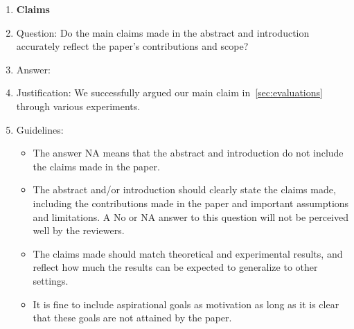 \documentclass{article}
\begin{document}
\begin{enumerate}

\item {\bf Claims}
    \item[] Question: Do the main claims made in the abstract and introduction accurately reflect the paper's contributions and scope?
    \item[] Answer: \answerYes{} %
    \item[] Justification: We successfully argued our main claim in~\ref{sec:evaluations} through various experiments.
    \item[] Guidelines:
    \begin{itemize}
        \item The answer NA means that the abstract and introduction do not include the claims made in the paper.
        \item The abstract and/or introduction should clearly state the claims made, including the contributions made in the paper and important assumptions and limitations. A No or NA answer to this question will not be perceived well by the reviewers. 
        \item The claims made should match theoretical and experimental results, and reflect how much the results can be expected to generalize to other settings. 
        \item It is fine to include aspirational goals as motivation as long as it is clear that these goals are not attained by the paper. 
    \end{itemize}


\end{enumerate}
\end{document}
